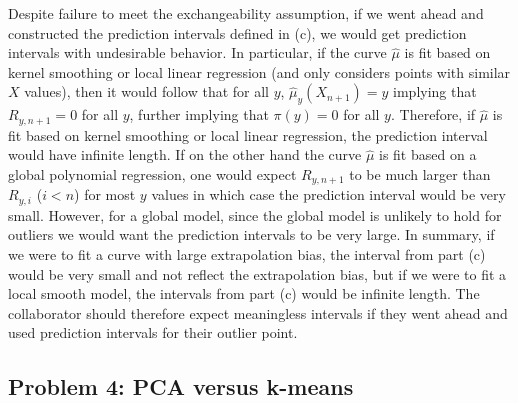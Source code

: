 \begin{enumerate}[label=(\alph*)]
Despite failure to meet the exchangeability assumption, if we went ahead and constructed the prediction intervals defined in (c), we would get prediction intervals with undesirable behavior. In particular, if the curve $\hat{\mu}$ is fit based on kernel smoothing or local linear regression (and only considers points with similar $X$ values), then it would follow that for all $y$, $\hat{\mu}_y(X_{n+1})= y$ implying that $R_{y,n+1}=0$ for all $y$, further implying that $\pi(y)=0$ for all $y$. Therefore, if $\hat{\mu}$ is fit based on kernel smoothing or local linear regression, the prediction interval would have infinite length. If on the other hand the curve $\hat{\mu}$ is fit based on a global polynomial regression, one would expect $R_{y,n+1}$ to be much larger than $R_{y,i}$  ($i <n$) for most $y$ values in which case the prediction interval would be very small. However, for a global model, since the global model is unlikely to hold for outliers we would want the prediction intervals to be very large. In summary, if we were to fit a curve with large extrapolation bias, the interval from part (c) would be very small and not reflect the extrapolation bias, but if we were to fit a local smooth model, the intervals from part (c) would be infinite length. The collaborator should therefore expect meaningless intervals if they went ahead and used prediction intervals for their outlier point. 

\end{enumerate}



\subsection*{Problem 4: PCA versus k-means}

